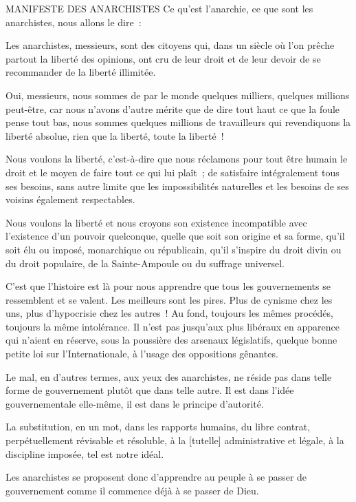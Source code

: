 \documentclass[french,twoside]{book} %
\newcommand\corr[1]{#1}
\newenvironment{quoteblock}%
  {\begin{quoting}}
  {\end{quoting}}
\newenvironment{quotebar}{%
    \def\FrameCommand{{\color{rubric!10!}\vrule width 0.5em} \hspace{0.9em}}%
    \def\OuterFrameSep{\itemsep} %
    \MakeFramed {\advance\hsize-\width \FrameRestore}
  }%
  {%
    \endMakeFramed
  }
\renewenvironment{quoteblock}%
  {%
    \savenotes
    \setstretch{0.9}
    \normalfont
    \begin{quotebar}
  }
  {%
    \end{quotebar}
    \spewnotes
  }
\begin{document}
\begin{quoteblock}
 MANIFESTE DES ANARCHISTES \noindent Ce qu’est l’anarchie, ce que sont les anarchistes, nous allons le dire :\par
 Les anarchistes, messieurs, sont des citoyens qui, dans un siècle où l’on prêche partout la liberté des opinions, ont cru de leur droit et de leur devoir de se recommander de la liberté illimitée.\par
   Oui, messieurs, nous sommes de par le monde quelques milliers, quelques millions peut-être, car nous n’avons d’autre mérite que de dire tout haut ce que la foule pense tout bas, nous sommes quelques millions de travailleurs qui revendiquons la liberté absolue, rien que la liberté, toute la liberté !\par
 Nous voulons la liberté, c’est-à-dire que nous réclamons pour tout être humain le droit et le moyen de faire tout ce qui lui plaît ; de satisfaire intégralement tous ses besoins, sans autre limite que les impossibilités naturelles et les besoins de ses voisins également respectables.\par
 Nous voulons la liberté et nous croyons son existence incompatible avec l’existence d’un pouvoir quelconque, quelle que soit son origine et sa forme, qu’il soit élu ou imposé, monarchique ou républicain, qu’il s’inspire du droit divin ou du droit populaire, de la Sainte-Ampoule ou du suffrage universel.\par
 C’est que l’histoire est là pour nous apprendre que tous les gouvernements se ressemblent et se valent. Les meilleurs sont les pires. Plus de cynisme chez les uns, plus d’hypocrisie chez les autres ! Au fond, toujours les mêmes procédés, toujours la même intolérance. Il n’est pas jusqu’aux plus libéraux en apparence qui n’aient en réserve, sous la poussière des arsenaux législatifs, quelque bonne petite loi sur l’Internationale, à l’usage des oppositions gênantes.\par
 Le mal, en d’autres termes, aux yeux des anarchistes, ne réside pas dans telle forme de gouvernement plutôt que dans telle autre. Il est dans l’idée gouvernementale elle-même, il est dans le principe d’autorité.\par
 La substitution, en un mot, dans les rapports humains, du libre contrat, perpétuellement révisable et résoluble, à la [{\corr tutelle}] administrative et légale, à la discipline imposée, tel est notre idéal.\par
 Les anarchistes se proposent donc d’apprendre au peuple à se passer de gouvernement comme il commence déjà à se passer de Dieu.\par

\end{quoteblock}
\end{document}
